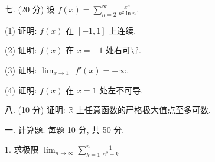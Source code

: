 \documentclass{examcollection}
\begin{document}
{\begin{minipage}{\textwidth}
七. (20 分) 设 $f(x) = \sum_{n=2}^{\infty} \frac{x^n}{n^2 \ln n}$.\par
(1) 证明: $f(x)$ 在 $[-1, 1]$ 上连续.\par
(2) 证明: $f(x)$ 在 $x = -1$ 处右可导.\par
(3) 证明: $\lim_{x \to 1^{-}} f'(x) = +\infty$.\par
(4) 证明: $f(x)$ 在 $x = 1$ 处左不可导.\par
八. (10 分) 证明: $\mathbb{R}$ 上任意函数的严格极大值点至多可数.\par
{}\smallskip
一. 计算题. 每题 10 分, 共 50 分.\par
1. 求极限 $\lim_{n\to \infty}\sum_{k = 1}^{n}\frac{1}{n^2 + k}$\par
\end{minipage}}
\ifdim\dimexpr\ht\proofbox+\dp\proofbox\relax>\textheight
\noindent\resizebox{!}{\textheight}{\usebox{\proofbox}}\else\noindent\usebox{\proofbox}\fi\clearpage
\end{document}
